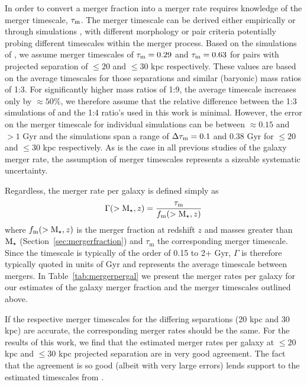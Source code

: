 In order to convert a merger fraction into a merger rate requires knowledge of the merger timescale, $\tau_{\rm{m}}$. The merger timescale can be derived either empirically \citep{Conselice:2009bi} or through simulations \citep{Kitzbichler:2008gi,Lotz:2010ie,Lotz:2010hf}, with different morphology or pair criteria potentially probing different timescales within the merger process. Based on the simulations of \citet{Lotz:2010ie}, we assume merger timescales of $\tau_{\rm{m}} = 0.29$ and $\tau_{\rm{m}} = 0.63$ for pairs with projected separation of $\leq 20$ and $\leq 30$ kpc respectively. These values are based on the average timescales for those separations and similar (baryonic) mass ratios of 1:3. For significantly higher mass ratios of 1:9, the average timescale increases only by $\approx 50\%$, we therefore assume that the relative difference between the 1:3 simulations of \citet{Lotz:2010ie} and the 1:4 ratio's used in this work is minimal. However, the error on the merger timescale for individual simulations can be between $\approx 0.15$ and $>1$ Gyr and the simulations span a range of $\Delta\tau_{\rm{m}} = 0.1$ and 0.38 Gyr for $\leq 20$ and $\leq 30$ kpc respectively. As is the case in all previous studies of the galaxy merger rate, the assumption of merger timescales represents a sizeable systematic uncertainty.

Regardless, the merger rate per galaxy is defined simply as
\begin{equation}
	\Gamma(>\text{M}_{\star}, z) = \frac{\tau_{\text{m}}}{f_{\text{m}}(>\text{M}_{\star}, z)}
\end{equation}
where $f_{\text{m}}(>\text{M}_{\star}, z)$ is the merger fraction at redshift $z$ and masses greater than $\text{M}_{\star}$ (Section~\ref{sec:mergerfraction}) and $\tau_{\text{m}}$ the corresponding merger timescale. Since the timescale is typically of the order of 0.15 to 2+ Gyr, $\Gamma$ is therefore typically quoted in units of Gyr and represents the average timescale between mergers. In Table~\ref{tab:mergerpergal} we present the merger rates per galaxy for our estimates of the galaxy merger fraction and the merger timescales outlined above.

If the respective merger timescales for the differing separations (20 kpc and 30 kpc) are accurate, the corresponding merger rates should be the same. For the results of this work, we find that the estimated merger rates per galaxy at $\leq 20$ kpc and $\leq 30$ kpc projected separation are in very good agreement. The fact that the agreement is so good (albeit with very large errors) lends support to the estimated timescales from \citet{Lotz:2010ie}.

